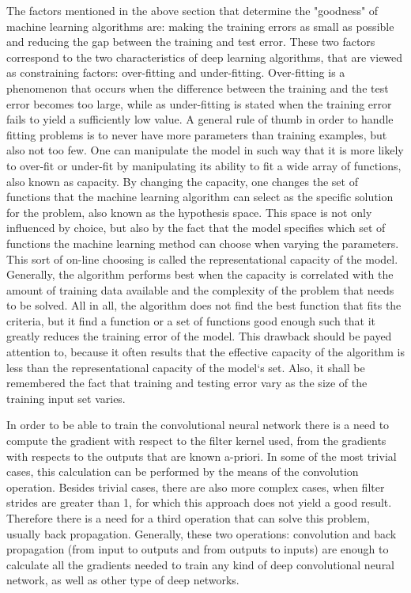 \documentclass[12pt,a4paper,twoside]{report}
\begin{document}
The factors mentioned in the above section that determine the "goodness" of machine learning algorithms are: making the training errors as small as possible and reducing the gap between the training and test error. These two factors correspond to the two characteristics of deep learning algorithms, that are viewed as constraining factors: over-fitting and under-fitting. Over-fitting is a phenomenon that occurs when the difference between the training and the test error becomes too large, while as under-fitting is stated when the training error fails to yield a sufficiently low value. A general rule of thumb in order to handle fitting problems is to never have more parameters than training examples, but also not too few. One can manipulate the model in such way that it is more likely to over-fit or under-fit by manipulating its ability to fit a wide array of functions, also known as capacity. By changing the capacity, one changes the set of functions that the machine learning algorithm can select as the specific solution for the problem, also known as the hypothesis space. This space is not only influenced by choice, but also by the fact that the model specifies which set of functions the machine learning method can choose when varying the parameters. This sort of on-line choosing is called the representational capacity of the model. Generally, the algorithm performs best when the capacity is correlated with the amount of training data available and the complexity of the problem that needs to be solved. All in all, the algorithm does not find the best function that fits the criteria, but it find a function or a set of functions good enough such that it greatly reduces the training error of the model. This drawback should be payed attention to, because it often results that the effective capacity of the algorithm is less than the representational capacity of the model`s set. Also, it shall be remembered the fact that training and testing error vary as the size of the training input set varies.\par
In order to be able to train the convolutional neural network there is a need to compute the gradient with respect to the filter kernel used, from the gradients with respects to the outputs that are known a-priori. In some of the most trivial cases, this calculation can be performed by the means of the convolution operation. Besides trivial cases, there are also more complex cases, when filter strides are greater than 1, for which this approach does not yield a good result. Therefore there is a need for a third operation that can solve this problem, usually back propagation. Generally, these two operations: convolution and back propagation (from input to outputs and from outputs to inputs) are enough to calculate all the gradients needed to train any kind of deep convolutional neural network, as well as other type of deep networks.\par
\end{document}
